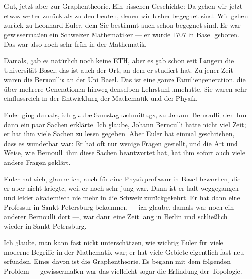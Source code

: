 \begin{spoken-clean}[00:03:08 - 00:05:40]
Gut, jetzt aber zur Graphentheorie. Ein bisschen Geschichte: Da gehen wir jetzt etwas weiter zurück als zu den Leuten, denen wir bisher begegnet sind. Wir gehen zurück zu Leonhard Euler, dem Sie bestimmt auch schon begegnet sind. Er war gewissermaßen ein Schweizer Mathematiker --- er wurde $1707$ in Basel geboren. Das war also noch sehr früh in der Mathematik.

Damals, gab es natürlich noch keine ETH, aber es gab schon seit Langem die Universität Basel; das ist auch der Ort, an dem er studiert hat. Zu jener Zeit waren die Bernoullis an der Uni Basel. Das ist eine ganze Familiengeneration, die über mehrere Generationen hinweg denselben Lehrstuhl innehatte. Sie waren sehr einflussreich in der Entwicklung der Mathematik und der Physik.

Euler ging damals, ich glaube Samstagnachmittags, zu Johann Bernoulli, der ihm dann ein paar Sachen erklärte. Ich glaube, Johann Bernoulli hatte nicht viel Zeit; er hat ihm viele Sachen zu lesen gegeben. Aber Euler hat einmal geschrieben, dass es wunderbar war: Er hat oft nur wenige Fragen gestellt, und die Art und Weise, wie Bernoulli ihm diese Sachen beantwortet hat, hat ihm sofort auch viele andere Fragen geklärt.

Euler hat sich, glaube ich, auch für eine Physikprofessur in Basel beworben, die er aber nicht kriegte, weil er noch sehr jung war. Dann ist er halt weggegangen und leider akademisch nie mehr in die Schweiz zurückgekehrt. Er hat dann eine Professur in Sankt Petersburg bekommen --- ich glaube, damals war noch ein anderer Bernoulli dort ---, war dann eine Zeit lang in Berlin und schließlich wieder in Sankt Petersburg.

Ich glaube, man kann fast nicht unterschätzen, wie wichtig Euler für viele moderne Begriffe in der Mathematik war; er hat viele Gebiete eigentlich fast neu erfunden. Eines davon ist die Graphentheorie. Es begann mit dem folgenden Problem --- gewissermaßen war das vielleicht sogar die Erfindung der Topologie.
\end{spoken-clean}

